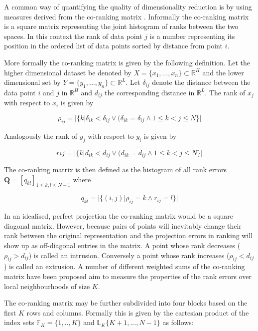 A common way of quantifying the quality of dimensionality reduction is by using measures derived from the co-ranking matrix \cite{lee2008rank}. Informally the co-ranking matrix is a square matrix representing the joint histogram of ranks between the two spaces. In this context the rank of data point $j$ is a number representing its position in the ordered list of data points sorted by distance from point $i$.

More formally the co-ranking matrix is given by the following definition. Let the higher dimensional dataset be denoted by $X = \{x_1, ..., x_n\} \subset \mathbb{R}^H$ and the lower dimensional set by $Y = \{y_1, ..., y_n\} \subset \mathbb{R}^L$. Let $\delta_{ij}$ denote the distance between the data point $i$ and $j$ in $\mathbb{R}^H$ and $d_{ij}$ the corresponding distance in $\mathbb{R}^L$. The rank of $x_j$ with respect to $x_i$ is given by

\begin{equation}
	\rho_{ij} = |\{k | \delta_{ik} < \delta_{ij} \lor (\delta_{ik} = \delta_{ij} \land 1 \leq k < j \leq N\}|
\end{equation}

Analogously the rank of $y_j$ with respect to $y_i$ is given by

\begin{equation}
	r{ij} = |\{k | d_{ik} < d_{ij} \lor (d_{ik} = d_{ij} \land 1 \leq k < j \leq N\}|
\end{equation}

The co-ranking matrix is then defined as the histogram of all rank errors $\bm{Q} = [q_{kl}]_{1 \leq k, l \leq N-1}$ where

\begin{equation}
	q_{kl} = |\{(i,j) | \rho_{ij} = k \land r_{ij} = l\}|
\end{equation}

In an idealised, perfect projection the co-ranking matrix would be a square diagonal matrix. However, because pairs of points will inevitably change their rank between the original representation and the projection errors in ranking will show up as off-diagonal entries in the matrix. A point whose rank decreases ($\rho_{ij} > d_{ij}$)  is called an intrusion. Conversely a point whose rank increases ($\rho_{ij} < d_{ij}$) is called an extrusion. A number of different weighted sums of the co-ranking matrix have been proposed aim to measure the properties of the rank errors over local neighbourhoods of size $K$.

The co-ranking matrix may be further subdivided into four blocks based on the first $K$ rows and columns. Formally this is given by the cartesian product of the index sets $\mathbb{F}_K = \{1, .., K\}$ and $\mathbb{L}_K \{K+1, ..., N-1\}$ as follows:

